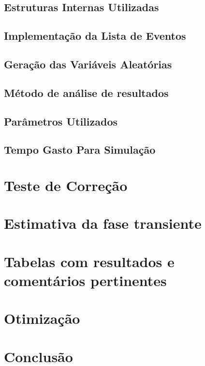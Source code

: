 \documentclass[a4paper,10pt]{article}
\begin{document}
\subsection{Estruturas Internas Utilizadas}
\subsection{Implementação da Lista de Eventos}
\subsection{Geração das Variáveis Aleatórias}
\subsection{Método de análise de resultados}
\subsection{Parâmetros Utilizados}
\subsection{Tempo Gasto Para Simulação}

\pagebreak

\section{Teste de Correção}

\pagebreak

\section{Estimativa da fase transiente}

\pagebreak

\section{Tabelas com resultados e comentários pertinentes}

\pagebreak

\section{Otimização}

\pagebreak

\section{Conclusão}

\pagebreak
\end{document}
